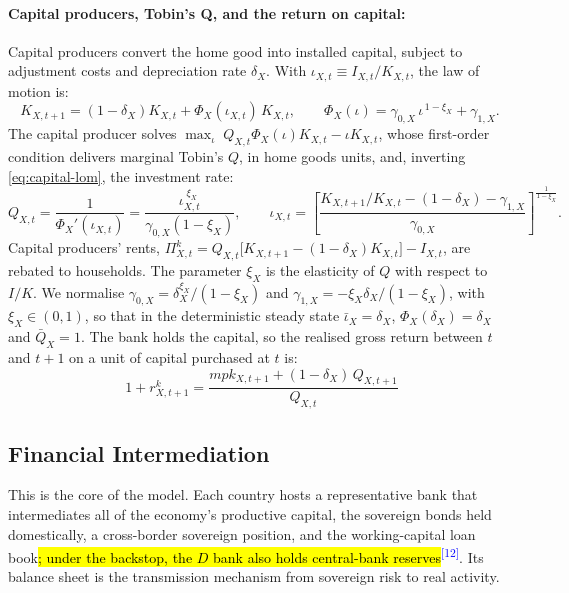 \documentclass[11pt]{article}
\newcommand{\A}[1]{\hl{#1}}
\newcommand{\chg}[1]{\textsuperscript{\textcolor{blue}{\scriptsize[#1]}}}
\begin{document}
\paragraph{Capital producers, Tobin's Q, and the return on capital:}
Capital producers convert the home good into installed capital, subject to adjustment costs \citep{jermann1998asset} and depreciation rate $\delta_X$. With $\iota_{X,t}\equiv I_{X,t}/K_{X,t}$, the law of motion is:
\begin{equation}
K_{X,t+1}=(1-\delta_X)K_{X,t}+\Phi_X(\iota_{X,t})\,K_{X,t},
\qquad
\Phi_X(\iota)=\gamma_{0,X}\,\iota^{\,1-\xi_X}+\gamma_{1,X}.
\label{eq:capital-lom}
\end{equation}
The capital producer solves $\max_{\iota}\;Q_{X,t}\Phi_X(\iota)K_{X,t}-\iota K_{X,t}$, whose first-order condition delivers marginal Tobin's $Q$, in home goods units, and, inverting
\eqref{eq:capital-lom}, the investment rate:
\begin{equation}
Q_{X,t}=\frac{1}{\Phi_X'(\iota_{X,t})}
      =\frac{\iota_{X,t}^{\;\xi_X}}{\gamma_{0,X}(1-\xi_X)},
\qquad
\iota_{X,t}=\left[\frac{K_{X,t+1}/K_{X,t}-(1-\delta_X)-\gamma_{1,X}}
                       {\gamma_{0,X}}\right]^{\frac{1}{1-\xi_X}} .
\label{eq:tobins-q}
\end{equation}
Capital producers' rents, $\Pi^{k}_{X,t}=Q_{X,t}\bigl[K_{X,t+1}-(1-\delta_X)K_{X,t}\bigr]-I_{X,t}$, are rebated to households. The parameter $\xi_X$ is the elasticity of $Q$ with respect to $I/K$. We normalise $\gamma_{0,X}=\delta_X^{\xi_X}/(1-\xi_X)$ and $\gamma_{1, X}=-\xi_X\delta_X/(1-\xi_X)$, with $\xi_X\in(0,1)$, so that in the deterministic steady state $\bar\iota_X=\delta_X$, $\Phi_X(\delta_X)=\delta_X$ and $\bar Q_X=1$. The bank holds the capital, so the realised gross return between $t$ and $t+1$ on a unit of capital purchased at $t$ is:
\begin{equation}
\;1+r^{k}_{X,t+1}=\frac{mpk_{X,t+1}+(1-\delta_X)\,Q_{X,t+1}}{Q_{X,t}}
\label{eq:rk}
\end{equation}

\subsection{Financial Intermediation}
This is the core of the model. Each country hosts a representative bank that intermediates all of the economy's productive capital, the sovereign bonds held domestically, a cross-border sovereign position, and the working-capital loan book\A{; under the backstop, the $D$ bank also holds central-bank reserves}\chg{12}. Its balance sheet is the transmission mechanism from sovereign risk to real activity.
\end{document}
